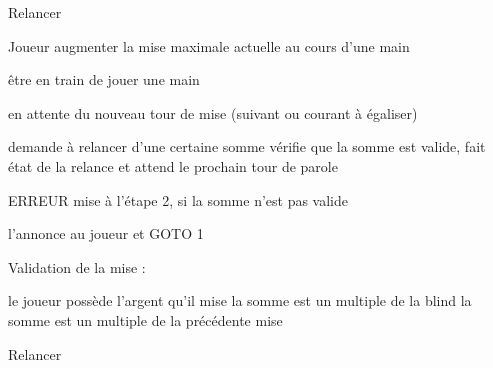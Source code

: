\begin{usecase}{Relancer}
	
	\begin{presentation}
		\actor Joueur
		\goal augmenter la mise maximale actuelle au cours d'une main
		
		\begin{precondition}
			\condition être en train de jouer une main
		\end{precondition}
		
		\begin{postcondition}
			\condition en attente du nouveau tour de mise (suivant ou courant à égaliser)
		\end{postcondition}
		
		\begin{includeuc}
			\aucun
		\end{includeuc}
	\end{presentation}
	
	\begin{scenario}
		\start demande à relancer d'une certaine somme
			\system vérifie que la somme est valide, fait état de la relance et attend le prochain tour de parole
	\end{scenario}
	
	\begin{alternative}
		\nomalt ERREUR mise
			\condition à l'étape 2, si la somme n'est pas valide
			
		\begin{alt}
			\system l'annonce au joueur et GOTO 1
		\end{alt}
	\end{alternative}
	
	\begin{regles}
		\nom Validation de la mise :
		\begin{enumerate}
			\regle le joueur possède l'argent qu'il mise
			\regle la somme est un multiple de la blind
			\regle la somme est un multiple de la précédente mise
		\end{enumerate}
	\end{regles}
	
	                {Relancer}
	
\end{usecase}




